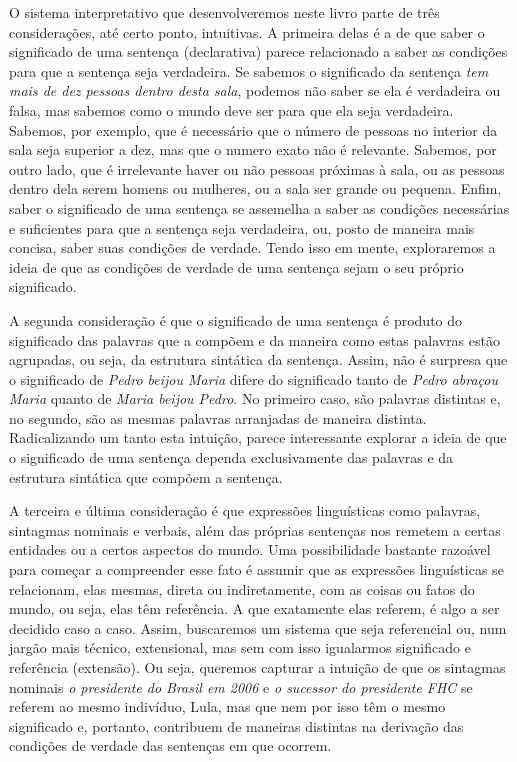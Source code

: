 \begin{refsection}


\n O sistema interpretativo que desenvolveremos neste livro parte de três considerações, até certo ponto, intuitivas. A primeira delas é a de que saber o significado de uma sentença (declarativa) parece relacionado a saber as condições para que a sentença seja verdadeira. Se sabemos o significado da sentença \textit{tem mais de dez pessoas dentro desta sala}, podemos não saber se ela é verdadeira ou falsa, mas sabemos como o mundo deve ser para que ela seja verdadeira. Sabemos, por exemplo, que é necessário que o número de pessoas no interior da sala seja superior a dez, mas que o numero exato não é relevante. Sabemos, por outro lado, que é irrelevante haver ou não pessoas próximas à sala, ou as pessoas dentro dela serem homens ou mulheres, ou a sala ser grande ou pequena. Enfim, saber o significado de uma sentença se assemelha a saber as condições necessárias e suficientes para que a sentença seja verdadeira, ou, posto de maneira mais concisa, saber suas condições de verdade. Tendo isso em mente, exploraremos a ideia de que as condições de verdade de uma sentença sejam o seu próprio significado. 

A segunda consideração é que o significado de uma sentença é produto do significado das palavras que a compõem e da maneira como estas palavras estão agrupadas, ou seja, da estrutura sintática da sentença. Assim, não é surpresa que o significado de \textit{Pedro beijou Maria} difere do significado tanto de \textit{Pedro abraçou Maria} quanto de \textit{Maria beijou Pedro}. No primeiro caso, são palavras distintas e, no segundo, são as mesmas palavras arranjadas de maneira distinta. Radicalizando um tanto esta intuição, parece interessante explorar a ideia de que o significado de uma sentença dependa exclusivamente das palavras e da estrutura sintática que compõem a sentença. 

A terceira e última consideração é que expressões linguísticas como palavras, sintagmas nominais e verbais, além das próprias sentenças nos remetem a certas entidades ou a certos aspectos do mundo. Uma possibilidade bastante razoável para começar a compreender esse fato é assumir que as expressões linguísticas se relacionam, elas mesmas, direta ou indiretamente, com as coisas ou fatos do mundo, ou seja, elas têm referência. A que exatamente elas referem, é algo a ser decidido caso a caso. Assim, buscaremos um sistema que seja referencial ou, num jargão mais técnico, extensional, mas sem com isso igualarmos significado e referência (extensão). Ou seja, queremos capturar a intuição de que os sintagmas nominais  \textit{o presidente do Brasil em 2006} e \textit{o sucessor do presidente FHC} se referem ao mesmo indivíduo, Lula, mas que nem por isso têm o mesmo significado e, portanto, contribuem de maneiras distintas na derivação das condições de verdade das sentenças em que ocorrem.


\end{refsection}
